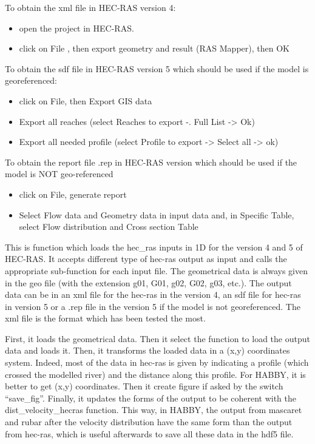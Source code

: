 \documentclass[letterpaper,10pt,english]{sphinxmanual}
\begin{document}
\begin{fulllineitems}
To obtain the xml file in HEC-RAS version 4:
\begin{itemize}
\item {} 
open the project in HEC-RAS.

\item {} 
click on File , then export geometry and result (RAS Mapper), then OK

\end{itemize}

To obtain the sdf file in HEC-RAS version 5 which should be used if the model is georeferenced:
\begin{itemize}
\item {} 
click on File, then Export GIS data

\item {} 
Export all reaches (select Reaches to export -. Full List -\textgreater{} Ok)

\item {} 
Export all needed profile (select Profile to export -\textgreater{} Select all -\textgreater{} ok)

\end{itemize}

To obtain the report file .rep in HEC-RAS version which should be used if the model is NOT geo-referenced
\begin{itemize}
\item {} 
click on File, generate report

\item {} 
Select Flow data and Geometry data in input data and, in Specific Table, select Flow distribution and
Cross section Table

\end{itemize}


This is function which loads the hec\_ras inputs in 1D for the version 4 and 5 of HEC-RAS. It accepts different type
of hec-ras output as input and calls the appropriate sub-function for each input file.  The geometrical data is
always given in the geo file (with the extension g01, G01, g02, G02, g03, etc.). The output data can be in an xml
file for the hec-ras in the version 4, an sdf file for hec-ras in version 5 or a .rep file in the version 5 if the
model is not georeferenced. The xml file is the format which has been tested the most.

First, it loads the geometrical data. Then it select the function to load the output data and loads it. Then, it
transforms the loaded data in a (x,y) coordinates system. Indeed, most of the data in hec-ras is given by indicating
a profile (which crossed the modelled river) and the distance along this profile. For HABBY, it is better to get
(x,y) coordinates. Then it create figure if asked by the switch “save\_fig”. Finally, it updates the forms of the
output to be coherent with the dist\_velocity\_hecras function.  This way, in HABBY, the output from mascaret and
rubar after the velocity distribution have the same form than the output from hec-ras, which is useful afterwards
to save all these data in the hdf5 file.

\end{fulllineitems}
\end{document}
